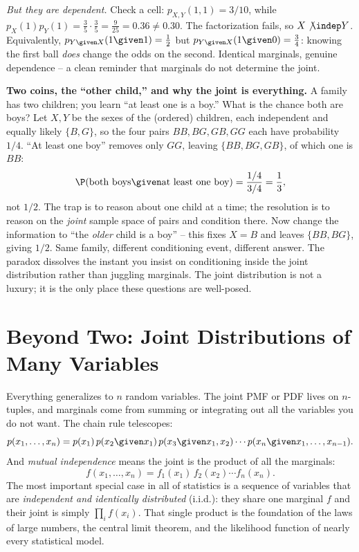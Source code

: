 \begin{example}
\emph{But they are dependent.} Check a cell: $p_{X,Y}(1,1) = 3/10$, while
$p_X(1)p_Y(1) = \tfrac35\cdot\tfrac35 = \tfrac{9}{25} = 0.36 \ne 0.30$. The
factorization fails, so $X\not\indep Y$. Equivalently, $p_{Y\given X}(1\given 1)
= \tfrac12$ but $p_{Y\given X}(1\given 0)=\tfrac34$: knowing the first ball
\emph{does} change the odds on the second. Identical marginals, genuine
dependence -- a clean reminder that marginals do not determine the joint.
\end{example}

\begin{paradoxbox}
\textbf{Two coins, the ``other child,'' and why the joint is everything.} A
family has two children; you learn ``at least one is a boy.'' What is the chance
both are boys? Let $X,Y$ be the sexes of the (ordered) children, each
independent and equally likely $\{B,G\}$, so the four pairs $BB,BG,GB,GG$ each
have probability $1/4$. ``At least one boy'' removes only $GG$, leaving
$\{BB,BG,GB\}$, of which one is $BB$:
\[
  \P(\text{both boys}\given \text{at least one boy}) = \frac{1/4}{3/4}
  = \frac13,
\]
not $1/2$. The trap is to reason about one child at a time; the resolution is to
reason on the \emph{joint} sample space of pairs and condition there. Now change
the information to ``the \emph{older} child is a boy'' -- this fixes $X=B$ and
leaves $\{BB, BG\}$, giving $1/2$. Same family, different conditioning event,
different answer. The paradox dissolves the instant you insist on conditioning
inside the joint distribution rather than juggling marginals. The joint
distribution is not a luxury; it is the only place these questions are
well-posed.
\end{paradoxbox}

\section{Beyond Two: Joint Distributions of Many Variables}
\label{ch13:many}

Everything generalizes to $n$ random variables. The joint PMF or PDF lives on
$n$-tuples, and marginals come from summing or integrating out all the variables
you do not want. The chain rule telescopes:
\[
  p(x_1,\dots,x_n) = p(x_1)\,p(x_2\given x_1)\,p(x_3\given x_1,x_2)\cdots
                     p(x_n\given x_1,\dots,x_{n-1}).
\]
And \emph{mutual independence} means the joint is the product of all the
marginals:
\[
  f(x_1,\dots,x_n) = f_1(x_1)\,f_2(x_2)\cdots f_n(x_n).
\]
The most important special case in all of statistics is a sequence of variables
that are \emph{independent and identically distributed} (i.i.d.): they share one
marginal $f$ and their joint is simply $\prod_i f(x_i)$. That single product is
the foundation of the laws of large numbers, the central limit theorem, and the
likelihood function of nearly every statistical model.


